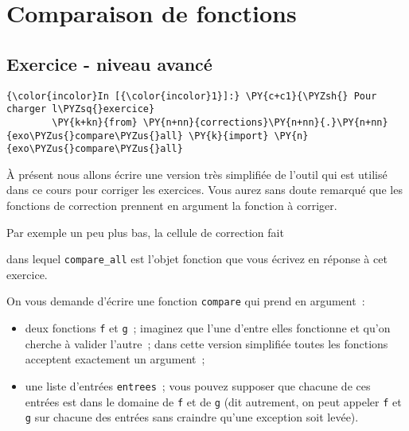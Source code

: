     
    
    
    

    

    \hypertarget{comparaison-de-fonctions}{%
\section{Comparaison de fonctions}\label{comparaison-de-fonctions}}

    \hypertarget{exercice---niveau-avancuxe9}{%
\subsection{Exercice - niveau
avancé}\label{exercice---niveau-avancuxe9}}

    \begin{Verbatim}[commandchars=\\\{\},frame=single,framerule=0.3mm,rulecolor=\color{cellframecolor}]
{\color{incolor}In [{\color{incolor}1}]:} \PY{c+c1}{\PYZsh{} Pour charger l\PYZsq{}exercice}
        \PY{k+kn}{from} \PY{n+nn}{corrections}\PY{n+nn}{.}\PY{n+nn}{exo\PYZus{}compare\PYZus{}all} \PY{k}{import} \PY{n}{exo\PYZus{}compare\PYZus{}all}
\end{Verbatim}


    À présent nous allons écrire une version très simplifiée de l'outil qui
est utilisé dans ce cours pour corriger les exercices. Vous aurez sans
doute remarqué que les fonctions de correction prennent en argument la
fonction à corriger.

Par exemple un peu plus bas, la cellule de correction fait

\begin{Shaded}
\begin{Highlighting}[frame=lines,framerule=0.6mm,rulecolor=\color{asisframecolor}]
\end{Highlighting}
\end{Shaded}

dans lequel \texttt{compare\_all} est l'objet fonction que vous écrivez
en réponse à cet exercice.

    On vous demande d'écrire une fonction \texttt{compare} qui prend en
argument~:

\begin{itemize}
\tightlist
\item
  deux fonctions \texttt{f} et \texttt{g}~; imaginez que l'une d'entre
  elles fonctionne et qu'on cherche à valider l'autre~; dans cette
  version simplifiée toutes les fonctions acceptent exactement un
  argument~;
\item
  une liste d'entrées \texttt{entrees}~; vous pouvez supposer que
  chacune de ces entrées est dans le domaine de \texttt{f} et de
  \texttt{g} (dit autrement, on peut appeler \texttt{f} et \texttt{g}
  sur chacune des entrées sans craindre qu'une exception soit levée).
\end{itemize}

